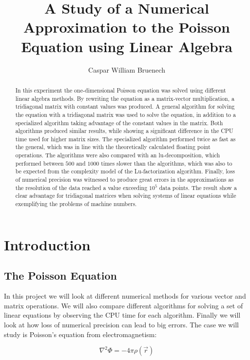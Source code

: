\documentclass[a4paper,10pt,English]{article}
\title{A Study of a Numerical Approximation to the Poisson Equation using Linear Algebra}
\author{Caspar William Bruenech}
\begin{document}
\maketitle

\begin{abstract}
    In this experiment the one-dimensional Poisson equation was solved using different linear algebra methods. By rewriting the equation as a matrix-vector multiplication, a tridiagonal matrix with constant values was produced. A general algorithm for solving the equation with a tridiagonal matrix was used to solve the equation, in addition to a specialized algorithm taking advantage of the constant values in the matrix. Both algorithms produced similar results, while showing a significant difference in the CPU time used for higher matrix sizes. The specialized algorithm performed twice as fast as the general, which was in line with the theoretically calculated floating point operations. The algorithms were also compared with an lu-decomposition, which performed between $500$ and $1000$ times slower than the algorithms, which was also to be expected from the complexity model of the Lu-factorization algorithm. Finally, loss of numerical precision was witnessed to produce great errors in the approximations as the resolution of the data reached a value exceeding $10^5$ data points. The result show a clear advantage for tridiagonal matrices when solving systems of linear equations while exemplifying the problems of machine numbers.
\end{abstract}

\section{Introduction}

\subsection{The Poisson Equation}
In this project we will look at different numerical methods for various vector and matrix operations. We will also compare different algorithms for solving a set of linear equations by observing the CPU time for each algorithm. Finally we will look at how loss of numerical precision can lead to big errors. The case we will study is Poisson's equation from electromagnetism:

\begin{equation}
    \nabla^2 \Phi = -4\pi \rho(\vec{r})
\end{equation}
\end{document}
